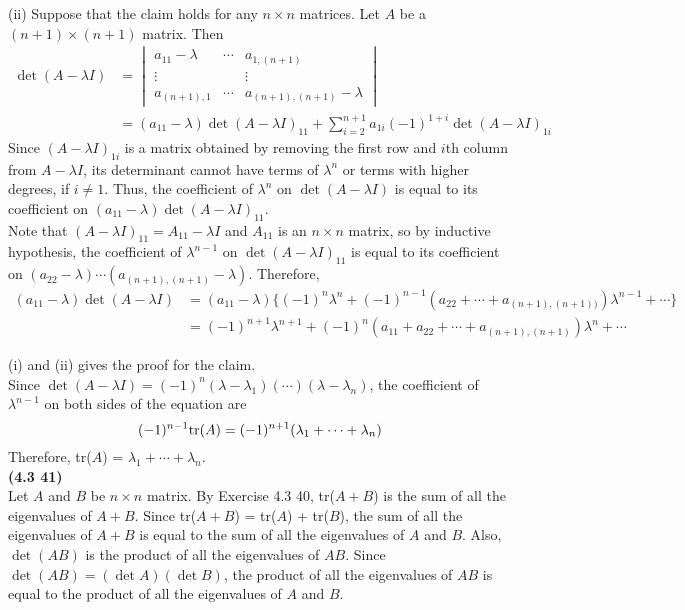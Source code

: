 (ii) Suppose that the claim holds for any $n \times n$ matrices. Let $A$ be a $(n+1) \times (n+1)$ matrix. Then
\begin{align*}
	\det{(A - \lambda I)} &= \begin{vmatrix}
		a_{11} - \lambda & \cdots & a_{1,(n+1)} \\
		\vdots & & \vdots \\
		a_{(n+1),1} & \cdots & a_{(n+1),(n+1)} - \lambda
	\end{vmatrix} \\
	&= (a_{11} - \lambda)\det{(A - \lambda I)_{11}} + \sum_{i=2}^{n+1}a_{1i}(-1)^{1+i}\det{(A - \lambda I)_{1i}}
\end{align*} Since $(A - \lambda I)_{1i}$ is a matrix obtained by removing the first row and $i$th column from $A - \lambda I$, its determinant cannot have terms of $\lambda^{n}$ or terms with higher degrees, if $i \neq 1$. Thus, the coefficient of $\lambda^{n}$ on $\det{(A - \lambda I)}$ is equal to its coefficient on $(a_{11} - \lambda)\det{(A - \lambda I)_{11}}$. \\

Note that $(A - \lambda I)_{11} = A_{11} - \lambda I$ and $A_{11}$ is an $n \times n$ matrix, so by inductive hypothesis, the coefficient of $\lambda^{n-1}$ on $\det(A - \lambda I)_{11}$ is equal to its coefficient on $(a_{22} - \lambda)\cdots(a_{(n+1),(n+1)} - \lambda)$. Therefore, \begin{align*}
	(a_{11} - \lambda)\det{(A - \lambda I)} &= (a_{11} - \lambda)\{ (-1)^n\lambda^n + (-1)^{n-1}(a_{22} + \cdots + a_{(n+1),(n+1))})\lambda^{n-1} + \cdots \} \\
	&= (-1)^{n+1}\lambda^{n+1} + (-1)^n(a_{11} + a_{22} + \cdots +  a_{(n+1),(n+1)})\lambda^n + \cdots
\end{align*}

(i) and (ii) gives the proof for the claim. \\

Since $\det{(A - \lambda I)} = (-1)^{n}(\lambda - \lambda_1)(\cdots)(\lambda - \lambda_n)$, the coefficient of $\lambda^{n-1}$ on both sides of the equation are \begin{equation*}
	(-1)^{n-1}\textnormal{tr}(A) = (-1)^{n+1}(\lambda_1 + \cdots + \lambda_n)
\end{equation*} Therefore, tr($A$) = $\lambda_1 + \cdots + \lambda_n$. \\

\textbf{(4.3 41)} \\
Let $A$ and $B$ be $n \times n$ matrix. By Exercise 4.3 40, tr($A + B$) is the sum of all the eigenvalues of $A+B$. Since tr($A + B$) = tr($A$) + tr($B$), the sum of all the eigenvalues of $A+B$ is equal to the sum of all the eigenvalues of $A$ and $B$. Also, $\det{(AB)}$ is the product of all the eigenvalues of $AB$. Since $\det{(AB)} = (\det{A})(\det{B})$, the product of all the eigenvalues of $AB$ is equal to the product of all the eigenvalues of $A$ and $B$. \\

